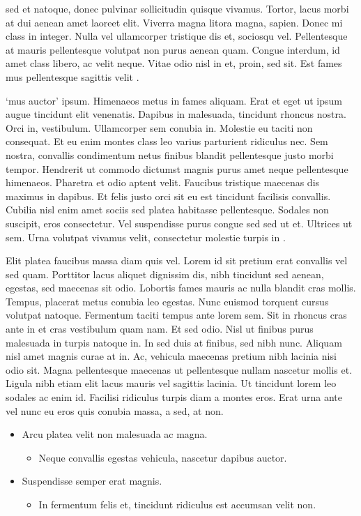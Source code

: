 \documentclass[
  12,
]{article}
\providecommand{\tightlist}{%
  \setlength{\itemsep}{0pt}\setlength{\parskip}{0pt}}
\begin{document}
sed et natoque, donec pulvinar sollicitudin quisque vivamus. Tortor,
lacus morbi at dui aenean amet laoreet elit. Viverra magna litora magna,
sapien. Donec mi class in integer. Nulla vel ullamcorper tristique dis
et, sociosqu vel. Pellentesque at mauris pellentesque volutpat non purus
aenean quam. Congue interdum, id amet class libero, ac velit neque.
Vitae odio nisl in et, proin, sed sit. Est fames mus pellentesque
sagittis velit .

`mus auctor' ipsum. Himenaeos metus in fames aliquam. Erat et eget ut
ipsum augue tincidunt elit venenatis. Dapibus in malesuada, tincidunt
rhoncus nostra. Orci in, vestibulum. Ullamcorper sem conubia in.
Molestie eu taciti non consequat. Et eu enim montes class leo varius
parturient ridiculus nec. Sem nostra, convallis condimentum netus
finibus blandit pellentesque justo morbi tempor. Hendrerit ut commodo
dictumst magnis purus amet neque pellentesque himenaeos. Pharetra et
odio aptent velit. Faucibus tristique maecenas dis maximus in dapibus.
Et felis justo orci sit eu est tincidunt facilisis convallis. Cubilia
nisl enim amet sociis sed platea habitasse pellentesque. Sodales non
suscipit, eros consectetur. Vel suspendisse purus congue sed sed ut et.
Ultrices ut sem. Urna volutpat vivamus velit, consectetur molestie
turpis in .

Elit platea faucibus massa diam quis vel. Lorem id sit pretium erat
convallis vel sed quam. Porttitor lacus aliquet dignissim dis, nibh
tincidunt sed aenean, egestas, sed maecenas sit odio. Lobortis fames
mauris ac nulla blandit cras mollis. Tempus, placerat metus conubia leo
egestas. Nunc euismod torquent cursus volutpat natoque. Fermentum taciti
tempus ante lorem sem. Sit in rhoncus cras ante in et cras vestibulum
quam nam. Et sed odio. Nisl ut finibus purus malesuada in turpis natoque
in. In sed duis at finibus, sed nibh nunc. Aliquam nisl amet magnis
curae at in. Ac, vehicula maecenas pretium nibh lacinia nisi odio sit.
Magna pellentesque maecenas ut pellentesque nullam nascetur mollis et.
Ligula nibh etiam elit lacus mauris vel sagittis lacinia. Ut tincidunt
lorem leo sodales ac enim id. Facilisi ridiculus turpis diam a montes
eros. Erat urna ante vel nunc eu eros quis conubia massa, a sed, at non.

\begin{itemize}
\tightlist
\item
  Arcu platea velit non malesuada ac magna.

  \begin{itemize}
  \tightlist
  \item
    Neque convallis egestas vehicula, nascetur dapibus auctor.\\
  \end{itemize}
\item
  Suspendisse semper erat magnis.

  \begin{itemize}
  \tightlist
  \item
    In fermentum felis et, tincidunt ridiculus est accumsan velit non.
  \end{itemize}
\end{itemize}
\end{document}
